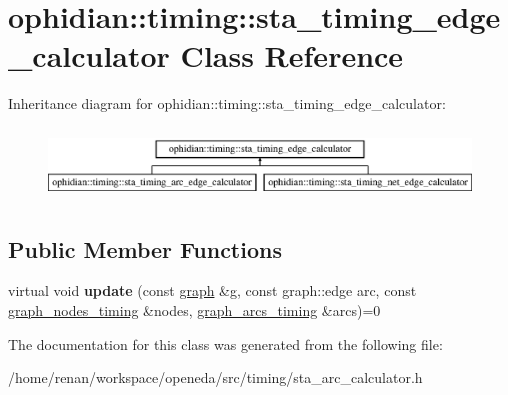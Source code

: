 \hypertarget{classophidian_1_1timing_1_1sta__timing__edge__calculator}{\section{ophidian\-:\-:timing\-:\-:sta\-\_\-timing\-\_\-edge\-\_\-calculator Class Reference}
\label{classophidian_1_1timing_1_1sta__timing__edge__calculator}
}
Inheritance diagram for ophidian\-:\-:timing\-:\-:sta\-\_\-timing\-\_\-edge\-\_\-calculator\-:\begin{figure}[H]
\begin{center}
\leavevmode
\includegraphics[height=1.924399cm]{classophidian_1_1timing_1_1sta__timing__edge__calculator}
\end{center}
\end{figure}
\subsection*{Public Member Functions}
\begin{DoxyCompactItemize}
\item 
\hypertarget{classophidian_1_1timing_1_1sta__timing__edge__calculator_a1621f0c51ed5b6a9ffcc9456a10d1645}{virtual void {\bfseries update} (const \hyperlink{classophidian_1_1timing_1_1graph}{graph} \&g, const graph\-::edge arc, const \hyperlink{classophidian_1_1timing_1_1graph__nodes__timing}{graph\-\_\-nodes\-\_\-timing} \&nodes, \hyperlink{classophidian_1_1timing_1_1graph__arcs__timing}{graph\-\_\-arcs\-\_\-timing} \&arcs)=0}\label{classophidian_1_1timing_1_1sta__timing__edge__calculator_a1621f0c51ed5b6a9ffcc9456a10d1645}

\end{DoxyCompactItemize}


The documentation for this class was generated from the following file\-:\begin{DoxyCompactItemize}
\item 
/home/renan/workspace/openeda/src/timing/sta\-\_\-arc\-\_\-calculator.\-h\end{DoxyCompactItemize}
